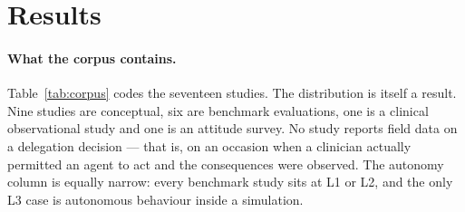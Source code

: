 \section{Results}
\label{sec:results}

\paragraph{What the corpus contains.}
Table~\ref{tab:corpus} codes the seventeen studies. The distribution is itself a result. Nine studies are conceptual, six are benchmark evaluations, one is a clinical observational study and one is an attitude survey. No study reports field data on a delegation decision --- that is, on an occasion when a clinician actually permitted an agent to act and the consequences were observed. The autonomy column is equally narrow: every benchmark study sits at L1 or L2, and the only L3 case is autonomous behaviour inside a simulation.

